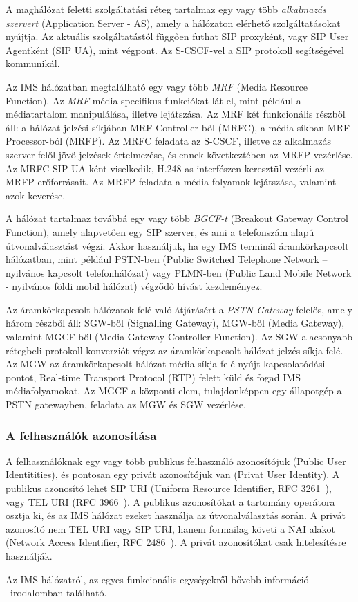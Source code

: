A maghálózat feletti szolgáltatási réteg tartalmaz egy vagy több \emph{alkalmazás szervert} (Application Server - AS), amely a hálózaton elérhető szolgáltatásokat nyújtja. Az aktuális szolgáltatástól függően futhat SIP proxyként, vagy SIP User Agentként (SIP UA), mint végpont. Az S-CSCF-vel a SIP protokoll segítségével kommunikál.

Az IMS hálózatban megtalálható egy vagy több \emph{MRF} (Media Resource Function). Az \emph{MRF} média specifikus funkciókat lát el, mint például a médiatartalom manipulálása, illetve lejátszása. Az MRF két funkcionális részből áll: a hálózat jelzési síkjában MRF Controller-ből (MRFC), a média síkban MRF Processor-ból (MRFP).  Az MRFC feladata az S-CSCF, illetve az alkalmazás szerver felől jövő jelzések értelmezése, és ennek következtében az MRFP vezérlése. Az MRFC SIP UA-ként viselkedik, H.248-as interfészen keresztül vezérli az MRFP erőforrásait. Az MRFP feladata a média folyamok lejátszása, valamint azok keverése. 

A hálózat tartalmaz továbbá egy vagy több \emph{BGCF-t} (Breakout Gateway Control Function), amely alapvetően egy SIP szerver, és ami a telefonszám alapú útvonalválasztást végzi. Akkor használjuk, ha egy IMS terminál áramkörkapcsolt hálózatban, mint például PSTN-ben (Public Switched Telephone Network – nyilvános kapcsolt telefonhálózat) vagy PLMN-ben (Public Land Mobile Network - nyilvános földi mobil hálózat) végződő hívást kezdeményez.

Az áramkörkapcsolt hálózatok felé való átjárásért a \emph{PSTN Gateway} felelős, amely három részből áll: SGW-ből (Signalling Gateway), MGW-ből (Media Gateway), valamint MGCF-ből (Media Gateway Controller Function). Az SGW alacsonyabb rétegbeli protokoll konverziót végez az áramkörkapcsolt hálózat jelzés síkja felé. Az MGW az áramkörkapcsolt hálózat média síkja felé nyújt kapcsolatódási pontot, Real-time Transport Protocol (RTP) felett küld és fogad IMS médiafolyamokat. Az MGCF a központi elem, tulajdonképpen egy állapotgép a PSTN gatewayben, feladata az MGW és SGW vezérlése.

\subsubsection{A felhasználók azonosítása}

A felhasználóknak egy vagy több publikus felhasználó azonosítójuk (Public User Identitities), és pontosan egy privát azonosítójuk van (Privat User Identity). A publikus azonosító lehet SIP URI (Uniform Resource Identifier, RFC 3261~\cite{rfc3261}), vagy TEL URI (RFC 3966~\cite{rfc3966}). A publikus azonosítókat a tartomány operátora osztja ki, és az IMS hálózat ezeket használja az útvonalválasztás során. A privát azonosító nem TEL URI vagy SIP URI, hanem formailag követi a NAI alakot (Network Access Identifier, RFC 2486~\cite{rfc2486}). A privát azonosítókat csak hitelesítésre használják.

\medskip

Az IMS hálózatról, az egyes funkcionális egységekről bővebb információ ~irodalomban található.

